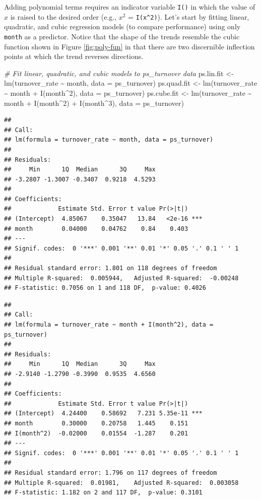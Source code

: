 \documentclass[
]{book}
\newenvironment{Shaded}{\begin{snugshade}}{\end{snugshade}}
\newcommand{\AttributeTok}[1]{\textcolor[rgb]{0.77,0.63,0.00}{#1}}
\newcommand{\CommentTok}[1]{\textcolor[rgb]{0.56,0.35,0.01}{\textit{#1}}}
\newcommand{\DecValTok}[1]{\textcolor[rgb]{0.00,0.00,0.81}{#1}}
\newcommand{\FunctionTok}[1]{\textcolor[rgb]{0.00,0.00,0.00}{#1}}
\newcommand{\NormalTok}[1]{#1}
\newcommand{\OtherTok}[1]{\textcolor[rgb]{0.56,0.35,0.01}{#1}}
\newcommand{\SpecialCharTok}[1]{\textcolor[rgb]{0.00,0.00,0.00}{#1}}
\begin{document}
Adding polynomial terms requires an indicator variable \texttt{I()} in which the value of \(x\) is raised to the desired order (e.g., \(x^2\) = \texttt{I(x\^{}2)}). Let's start by fitting linear, quadratic, and cubic regression models (to compare performance) using only \texttt{month} as a predictor. Notice that the shape of the trends resemble the cubic function shown in Figure \ref{fig:poly-fun} in that there are two discernible inflection points at which the trend reverses directions.

\begin{Shaded}
\begin{Highlighting}[]
\CommentTok{\# Fit linear, quadratic, and cubic models to ps\_turnover data}
\NormalTok{ps.lin.fit }\OtherTok{\textless{}{-}} \FunctionTok{lm}\NormalTok{(turnover\_rate }\SpecialCharTok{\textasciitilde{}}\NormalTok{ month, }\AttributeTok{data =}\NormalTok{ ps\_turnover)}
\NormalTok{ps.quad.fit }\OtherTok{\textless{}{-}} \FunctionTok{lm}\NormalTok{(turnover\_rate }\SpecialCharTok{\textasciitilde{}}\NormalTok{ month }\SpecialCharTok{+} \FunctionTok{I}\NormalTok{(month}\SpecialCharTok{\^{}}\DecValTok{2}\NormalTok{), }\AttributeTok{data =}\NormalTok{ ps\_turnover)}
\NormalTok{ps.cube.fit }\OtherTok{\textless{}{-}} \FunctionTok{lm}\NormalTok{(turnover\_rate }\SpecialCharTok{\textasciitilde{}}\NormalTok{ month }\SpecialCharTok{+} \FunctionTok{I}\NormalTok{(month}\SpecialCharTok{\^{}}\DecValTok{2}\NormalTok{) }\SpecialCharTok{+} \FunctionTok{I}\NormalTok{(month}\SpecialCharTok{\^{}}\DecValTok{3}\NormalTok{), }\AttributeTok{data =}\NormalTok{ ps\_turnover)}
\end{Highlighting}
\end{Shaded}

\begin{verbatim}
## 
## Call:
## lm(formula = turnover_rate ~ month, data = ps_turnover)
## 
## Residuals:
##     Min      1Q  Median      3Q     Max 
## -3.2807 -1.3007 -0.3407  0.9218  4.5293 
## 
## Coefficients:
##             Estimate Std. Error t value Pr(>|t|)    
## (Intercept)  4.85067    0.35047   13.84   <2e-16 ***
## month        0.04000    0.04762    0.84    0.403    
## ---
## Signif. codes:  0 '***' 0.001 '**' 0.01 '*' 0.05 '.' 0.1 ' ' 1
## 
## Residual standard error: 1.801 on 118 degrees of freedom
## Multiple R-squared:  0.005944,   Adjusted R-squared:  -0.00248 
## F-statistic: 0.7056 on 1 and 118 DF,  p-value: 0.4026
\end{verbatim}

\begin{verbatim}
## 
## Call:
## lm(formula = turnover_rate ~ month + I(month^2), data = ps_turnover)
## 
## Residuals:
##     Min      1Q  Median      3Q     Max 
## -2.9140 -1.2790 -0.3990  0.9535  4.6560 
## 
## Coefficients:
##             Estimate Std. Error t value Pr(>|t|)    
## (Intercept)  4.24400    0.58692   7.231 5.35e-11 ***
## month        0.30000    0.20758   1.445    0.151    
## I(month^2)  -0.02000    0.01554  -1.287    0.201    
## ---
## Signif. codes:  0 '***' 0.001 '**' 0.01 '*' 0.05 '.' 0.1 ' ' 1
## 
## Residual standard error: 1.796 on 117 degrees of freedom
## Multiple R-squared:  0.01981,    Adjusted R-squared:  0.003058 
## F-statistic: 1.182 on 2 and 117 DF,  p-value: 0.3101
\end{verbatim}
\end{document}
